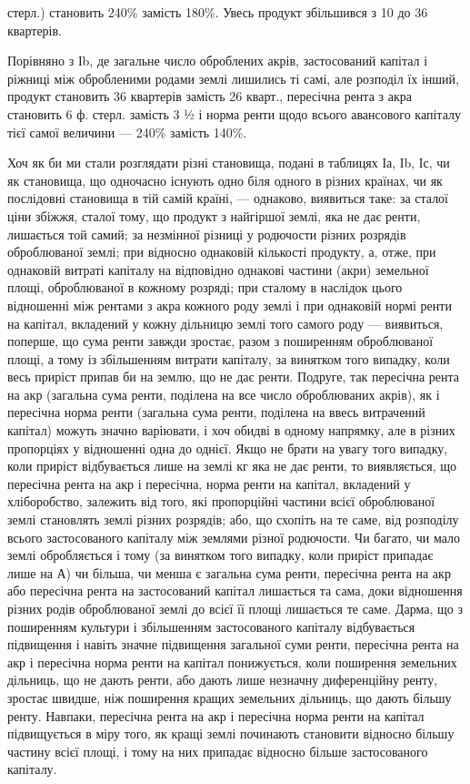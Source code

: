 стерл.) становить 240\% замість 180\%. Увесь продукт збільшився з 10 до
36 квартерів.

Порівняно з Іb, де загальне число оброблених акрів, застосований капітал
і ріжниці між обробленими родами землі лишились ті самі, але розподіл
їх інший, продукт становить 36 квартерів замість 26 кварт., пересічна рента
з акра становить 6 ф. стерл. замість 3 ½ і норма ренти щодо всього авансового
капіталу тієї самої величини — 240\% замість 140\%.

Хоч як би ми стали розглядати різні становища, подані в таблицях Іа,
Іb, Іс, чи як становища, що одночасно існують одно біля одного в різних країнах,
чи як послідовні становища в тій самій країні, — однаково, виявиться таке:
за сталої ціни збіжжя, сталої тому, що продукт з найгіршої землі, яка не дає
ренти, лишається той самий; за незмінної різниці у родючости різних розрядів
оброблюваної землі; при відносно однаковій кількості продукту, а, отже,
при однаковій витраті капіталу на відповідно однакові частини (акри) земельної
площі, оброблюваної в кожному розряді; при сталому в наслідок цього
відношенні між рентами з акра кожного роду землі і при однаковій нормі ренти
на капітал, вкладений у кожну дільницю землі того самого роду — виявиться,
поперше, що сума ренти завжди зростає, разом з поширенням оброблюваної
площі, а тому із збільшенням витрати капіталу, за винятком того випадку, коли
весь приріст припав би на землю, що не дає ренти. Подруге, так пересічна
рента на акр (загальна сума ренти, поділена на все число оброблюваних
акрів), як і пересічна норма ренти (загальна сума ренти, поділена на ввесь
витрачений капітал) можуть значно варіювати, і хоч обидві в одному напрямку,
але в різних пропорціях у відношенні одна до однієї. Якщо не брати
на увагу того випадку, коли приріст відбувається лише на землі кг
яка не дає ренти, то виявляється, що пересічна рента на акр і пересічна,
норма ренти на капітал, вкладений у хліборобство, залежить від того, які пропорційні
частини всієї оброблюваної землі становлять землі різних розрядів;
або, що схопіть на те саме, від розподілу всього застосованого капіталу між
землями різної родючости. Чи багато, чи мало землі обробляється і тому (за
винятком того випадку, коли приріст припадає лише на А) чи більша, чи
менша є загальна сума ренти, пересічна рента на акр або пересічна рента на
застосований капітал лишається та сама, доки відношення різних родів оброблюваної
землі до всієї її площі лишається те саме. Дарма, що з поширенням
культури і збільшенням застосованого капіталу відбувається підвищення і
навіть значне підвищення загальної суми ренти, пересічна рента на акр і
пересічна норма ренти на капітал понижується, коли поширення земельних
дільниць, що не дають ренти, або дають лише незначну диференційну ренту,
зростає швидше, ніж поширення кращих земельних дільниць, що дають більшу
ренту. Навпаки, пересічна рента на акр і пересічна норма ренти на капітал підвищується в міру того,
як кращі землі починають становити відносно більшу
частину всієї площі, і тому на них припадає відносно більше застосованого
капіталу.

